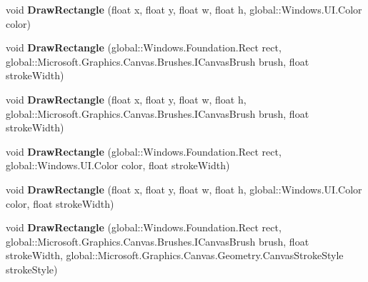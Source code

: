 \begin{DoxyCompactItemize}
\mbox{\label{class_microsoft_1_1_graphics_1_1_canvas_1_1_canvas_drawing_session_a96a8c0094f87cd750ce845265c86cd4d}} 
void {\bfseries Draw\+Rectangle} (float x, float y, float w, float h, global\+::\+Windows.\+U\+I.\+Color color)
\item 
\mbox{\label{class_microsoft_1_1_graphics_1_1_canvas_1_1_canvas_drawing_session_af36bf12f3dd3cc8de5d5e6410229d617}} 
void {\bfseries Draw\+Rectangle} (global\+::\+Windows.\+Foundation.\+Rect rect, global\+::\+Microsoft.\+Graphics.\+Canvas.\+Brushes.\+I\+Canvas\+Brush brush, float stroke\+Width)
\item 
\mbox{\label{class_microsoft_1_1_graphics_1_1_canvas_1_1_canvas_drawing_session_adca9b6d1f0dac2e91e424c53f5a2f188}} 
void {\bfseries Draw\+Rectangle} (float x, float y, float w, float h, global\+::\+Microsoft.\+Graphics.\+Canvas.\+Brushes.\+I\+Canvas\+Brush brush, float stroke\+Width)
\item 
\mbox{\label{class_microsoft_1_1_graphics_1_1_canvas_1_1_canvas_drawing_session_a02eb48c19bee3958a06857db78ccc690}} 
void {\bfseries Draw\+Rectangle} (global\+::\+Windows.\+Foundation.\+Rect rect, global\+::\+Windows.\+U\+I.\+Color color, float stroke\+Width)
\item 
\mbox{\label{class_microsoft_1_1_graphics_1_1_canvas_1_1_canvas_drawing_session_a28a64f9f29f0edaaa2016023bf267d2e}} 
void {\bfseries Draw\+Rectangle} (float x, float y, float w, float h, global\+::\+Windows.\+U\+I.\+Color color, float stroke\+Width)
\item 
\mbox{\label{class_microsoft_1_1_graphics_1_1_canvas_1_1_canvas_drawing_session_a77c25d21ef99cb3a408ceec333dd119b}} 
void {\bfseries Draw\+Rectangle} (global\+::\+Windows.\+Foundation.\+Rect rect, global\+::\+Microsoft.\+Graphics.\+Canvas.\+Brushes.\+I\+Canvas\+Brush brush, float stroke\+Width, global\+::\+Microsoft.\+Graphics.\+Canvas.\+Geometry.\+Canvas\+Stroke\+Style stroke\+Style)

\end{DoxyCompactItemize}
